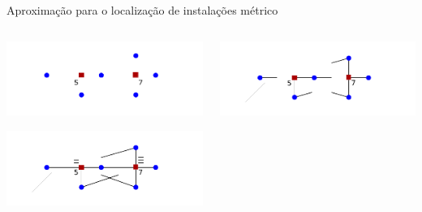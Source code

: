 \documentclass[final]{beamer}
\begin{document}
\begin{frame}[t]
\begin{columns}[t]
\begin{column}{0.48\paperwidth}
\begin{block}{Aproximação para o localização de instalações métrico}
      \begin{columns}
        \begin{column}{0.23\paperwidth}
              \begin{tcolorbox}
                \vspace{-1cm}\hspace{-2.3cm}\includegraphics[scale=1.9]{imgs/fl1.pdf}\vspace{-1cm}
              \end{tcolorbox}
            \begin{tcolorbox}
              \vspace{-1cm}\hspace{-2.3cm}\includegraphics[scale=1.9]{imgs/fl3.pdf}\vspace{-1cm}
            \end{tcolorbox}
            
         \end{column}

         \begin{column}{0.23\paperwidth}
          \begin{tcolorbox}
            \vspace{-1cm}\hspace{-2.3cm}\includegraphics[scale=1.9]{imgs/fl2.pdf}\vspace{-1cm}
          \end{tcolorbox}


\end{column}
\end{columns}
\end{block}
\end{column}
\end{columns}
\end{frame}
\end{document}
